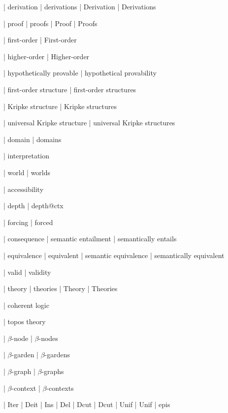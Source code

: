  | derivation
 | derivations
 | Derivation
 | Derivations

 | proof
 | proofs
 | Proof
 | Proofs
 
 | first-order
 | First-order

 | higher-order
 | Higher-order

 | hypothetically provable
 | hypothetical provability

 | first-order structure
 | first-order structures

 | Kripke structure
 | Kripke structures

 | universal Kripke structure
 | universal Kripke structures

 | domain
 | domains

 | interpretation

 | world
 | worlds

 | accessibility

 | depth
 | depth@ctx

 | forcing
 | forced

 | consequence
 | semantic entailment
 | semantically entails

 | equivalence
 | equivalent
 | semantic equivalence
 | semantically equivalent

 | valid
 | validity

 | theory
 | theories
 | Theory
 | Theories

 | coherent logic

 | topos theory
 
 | $\beta$-node
 | $\beta$-nodes

 | $\beta$-garden
 | $\beta$-gardens

 | $\beta$-graph
 | $\beta$-graphs

 | $\beta$-context
 | $\beta$-contexts

 | Iter
 | Deit
 | Ins
 | Del
 | Dcut{\da}
 | Dcut{\ua}
 | Unif{\da}
 | Unif{\ua}
 | epis{\da}